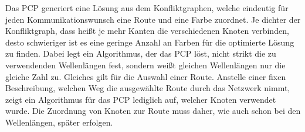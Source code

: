 Das PCP generiert eine Lösung aus dem Konfliktgraphen, welche eindeutig für jeden Kommunikationswunsch eine Route und eine Farbe zuordnet. Je dichter der Konfliktgraph, dass heißt
je mehr Kanten die verschiedenen Knoten verbinden, desto schwieriger ist es eine geringe Anzahl an Farben für die optimierte Lösung zu finden. Dabei legt ein Algorithmus, der das
PCP löst, nicht strikt die zu verwendenden Wellenlängen fest, sondern weißt gleichen Wellenlängen nur die gleiche Zahl zu. Gleiches gilt für die Auswahl einer Route. Anstelle
einer fixen Beschreibung, welchen Weg die ausgewählte Route durch das Netzwerk nimmt, zeigt ein Algorithmus für das PCP lediglich auf, welcher Knoten verwendet wurde. 
Die Zuordnung von Knoten zur Route muss daher, wie auch schon bei den Wellenlängen, später erfolgen.

